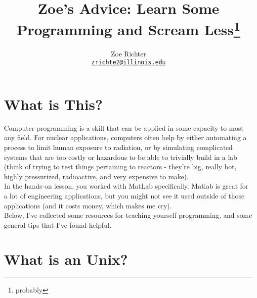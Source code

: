 \documentclass[letterpaper]{article}
\author{Zoe Richter
        \\ \href{mailto:zrichte2@illinois.edu}{\texttt{zrichte2@illinois.edu}}
}
\title{Zoe's Advice:  Learn Some Programming and Scream Less\thanks{probably}}
\begin{document}
\maketitle
\section{What is This?}

Computer programming is a skill that can be applied in some capacity to most any field.  For nuclear applications, computers often help by either automating a process to limit human exposure to radiation, or by simulating complicated systems that are too costly or hazardous to be able to trivially build in a lab (think of trying to test things pertaining to reactors - they're big, really hot, highly pressurized, radioactive, and very expensive to make).\\

In the hands-on lesson, you worked with MatLab specifically.  Matlab is great for a lot of engineering applications, but you might not see it used outside of those applications (and it costs money, which makes me cry).\\

Below, I've collected some resources for teaching yourself programming, and some general tips that I've found helpful.

\section{What is an Unix?}
\end{document}
